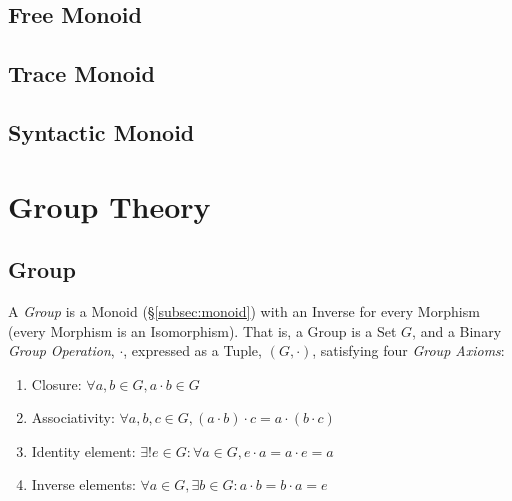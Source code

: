 \subsection{Free Monoid}\label{subsec:free_monoid}

\subsection{Trace Monoid}\label{subsec:trace_monoid}

\subsection{Syntactic Monoid}\label{subsec:syntactic_monoid}



\section{Group Theory}\label{sec:group_theory}

\subsection{Group}\label{subsec:group}

A \emph{Group} is a Monoid (\S\ref{subsec:monoid}) with an Inverse for
every Morphism (every Morphism is an Isomorphism). That is, a Group is
a Set $G$, and a Binary \emph{Group Operation}, $\cdot$, expressed as
a Tuple, $(G,\cdot)$, satisfying four \emph{Group Axioms}:
\begin{enumerate}
    \item Closure: $\forall a,b \in G, a \cdot b \in G$
    \item Associativity: $\forall a,b,c \in G, (a \cdot b) \cdot c = a
      \cdot (b \cdot c)$
    \item Identity element: $\exists! e \in G : \forall a \in G,
      e \cdot a = a \cdot e = a$
    \item Inverse elements: $\forall a \in G, \exists b \in G :
      a \cdot b = b \cdot a = e$
\end{enumerate}

